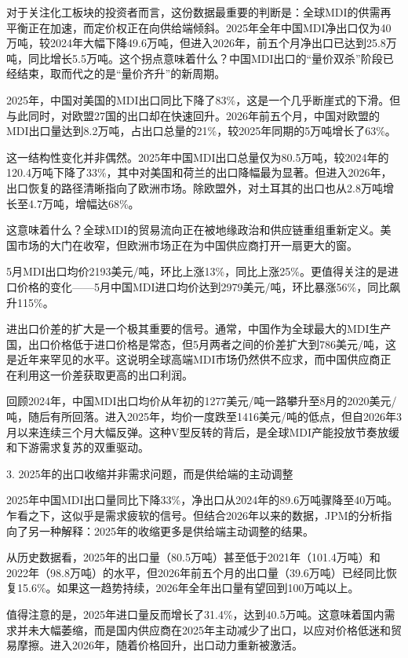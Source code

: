 \documentclass[11pt]{ctexart}
\begin{document}
对于关注化工板块的投资者而言，这份数据最重要的判断是：全球MDI的供需再平衡正在加速，而定价权正在向供给端倾斜。2025年全年中国MDI净出口仅为40万吨，较2024年大幅下降49.6万吨，但进入2026年，前五个月净出口已达到25.8万吨，同比增长5.5万吨。这个拐点意味着什么？中国MDI出口的“量价双杀”阶段已经结束，取而代之的是“量价齐升”的新周期。

2025年，中国对美国的MDI出口同比下降了83\%，这是一个几乎断崖式的下滑。但与此同时，对欧盟27国的出口却在快速回升。2026年前五个月，中国对欧盟的MDI出口量达到8.2万吨，占出口总量的21\%，较2025年同期的5万吨增长了63\%。

这一结构性变化并非偶然。2025年中国MDI出口总量仅为80.5万吨，较2024年的120.4万吨下降了33\%，其中对美国和荷兰的出口降幅最为显著。但进入2026年，出口恢复的路径清晰指向了欧洲市场。除欧盟外，对土耳其的出口也从2.8万吨增长至4.7万吨，增幅达68\%。

这意味着什么？全球MDI的贸易流向正在被地缘政治和供应链重组重新定义。美国市场的大门在收窄，但欧洲市场正在为中国供应商打开一扇更大的窗。

5月MDI出口均价2193美元/吨，环比上涨13\%，同比上涨25\%。更值得关注的是进口价格的变化——5月中国MDI进口均价达到2979美元/吨，环比暴涨56\%，同比飙升115\%。

进出口价差的扩大是一个极其重要的信号。通常，中国作为全球最大的MDI生产国，出口价格低于进口价格是常态，但5月两者之间的价差扩大到786美元/吨，这是近年来罕见的水平。这说明全球高端MDI市场仍然供不应求，而中国供应商正在利用这一价差获取更高的出口利润。

回顾2024年，中国MDI出口均价从年初的1277美元/吨一路攀升至8月的2020美元/吨，随后有所回落。进入2025年，均价一度跌至1416美元/吨的低点，但自2026年3月以来连续三个月大幅反弹。这种V型反转的背后，是全球MDI产能投放节奏放缓和下游需求复苏的双重驱动。

3. 2025年的出口收缩并非需求问题，而是供给端的主动调整

2025年中国MDI出口量同比下降33\%，净出口从2024年的89.6万吨骤降至40万吨。乍看之下，这似乎是需求疲软的信号。但结合2026年以来的数据，JPM的分析指向了另一种解释：2025年的收缩更多是供给端主动调整的结果。

从历史数据看，2025年的出口量（80.5万吨）甚至低于2021年（101.4万吨）和2022年（98.8万吨）的水平，但2026年前五个月的出口量（39.6万吨）已经同比恢复15.6\%。如果这一趋势持续，2026年全年出口量有望回到100万吨以上。

值得注意的是，2025年进口量反而增长了31.4\%，达到40.5万吨。这意味着国内需求并未大幅萎缩，而是国内供应商在2025年主动减少了出口，以应对价格低迷和贸易摩擦。进入2026年，随着价格回升，出口动力重新被激活。
\end{document}
